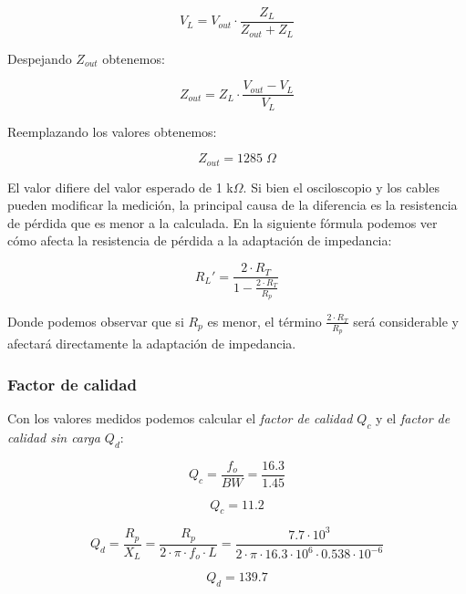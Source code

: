 \begin{equation}
    V_{L} = V_{out} \cdot \frac{Z_{L}}{Z_{out} + Z_L}
\end{equation}

Despejando $Z_{out}$ obtenemos:

\begin{equation}
    Z_{out} = Z_L \cdot \frac{V_{out} - V_L}{V_L}
\end{equation}

Reemplazando los valores obtenemos:

\begin{equation}
    \boxed{Z_{out} = 1285\; \Omega}
\end{equation}

El valor difiere del valor esperado de 1 k$\Omega$. Si bien el osciloscopio y los cables pueden modificar la medición, la principal causa de la diferencia es la resistencia de pérdida
que es menor a la calculada. En la siguiente fórmula podemos ver cómo afecta la resistencia de pérdida a la adaptación de impedancia:

\begin{equation}
    R_L' = \frac{2 \cdot R_T}{1 - \frac{2 \cdot R_T}{R_p}}
\end{equation}

Donde podemos observar que si $R_p$ es menor, el término $\frac{2 \cdot R_T}{R_p}$ será considerable y afectará directamente la adaptación de impedancia. 

\subsubsection{Factor de calidad}

Con los valores medidos podemos calcular el \textit{factor de calidad $Q_c$} y el \textit{factor de calidad sin carga $Q_d$}:

\begin{equation}
    Q_c = \frac{f_o}{BW} = \frac{16.3}{1.45}
\end{equation}

\begin{equation}
    \boxed{Q_c = 11.2}
\end{equation}

\begin{equation}
    Q_d = \frac{R_p}{X_L} = \frac{R_p}{2 \cdot \pi \cdot f_o \cdot L} = \frac{7.7 \cdot 10^3}{2 \cdot \pi \cdot 16.3 \cdot 10^6 \cdot 0.538 \cdot 10^{-6}}
\end{equation}

\begin{equation}
    \boxed{Q_d = 139.7}
\end{equation}



